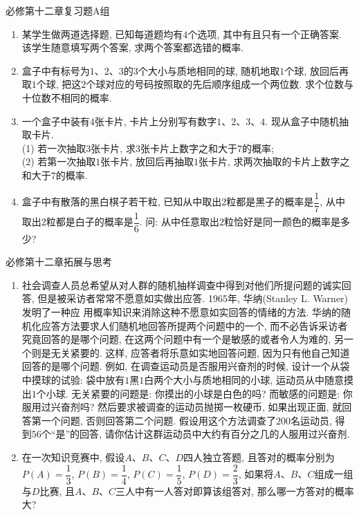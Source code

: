 \documentclass[10pt,a4paper]{article}
\begin{document}
必修第十二章复习题A组

\begin{enumerate}[1.]
\item 某学生做两道选择题, 已知每道题均有$4$个选项, 其中有且只有一个正确答案. 该学生随意填写两个答案, 求两个答案都选错的概率.
\item 盒子中有标号为$1$、$2$、$3$的$3$个大小与质地相同的球, 随机地取$1$个球, 放回后再取$1$个球, 把这$2$个球对应的号码按照取的先后顺序组成一个两位数. 求个位数与十位数不相同的概率.
\item 一个盒子中装有$4$张卡片, 卡片上分别写有数字$1$、$2$、$3$、$4$. 现从盒子中随机抽取卡片.\\
(1) 若一次抽取$3$张卡片, 求$3$张卡片上数字之和大于$7$的概率;\\
(2) 若第一次抽取$1$张卡片, 放回后再抽取$1$张卡片, 求两次抽取的卡片上数字之和大于$7$的概率.
\item 盒子中有散落的黑白棋子若干粒, 已知从中取出$2$粒都是黑子的概率是$\dfrac 17$, 从中取出$2$粒都是白子的概率是$\dfrac 16$. 问: 从中任意取出$2$粒恰好是同一颜色的概率是多少?
\end{enumerate}

必修第十二章拓展与思考

\begin{enumerate}[1.]
\item 社会调查人员总希望从对人群的随机抽样调查中得到对他们所提问题的诚实回答, 但是被采访者常常不愿意如实做出应答. 1965年, 华纳(Stanley L. Warner)发明了一种应
用概率知识来消除这种不愿意如实回答的情绪的方法. 华纳的随机化应答方法要求人们随机地回答所提两个问题中的一个, 而不必告诉采访者究竟回答的是哪个问题, 在这两个问题中有一个是敏感的或者令人为难的, 另一个则是无关紧要的. 这样, 应答者将乐意如实地回答问题, 因为只有他自己知道回答的是哪个问题. 例如, 在调查运动员是否服用兴奋剂的时候, 设计一个从袋中摸球的试验: 袋中放有$1$黑$1$白两个大小与质地相同的小球, 运动员从中随意摸出$1$个小球. 无关紧要的问题是: 你摸出的小球是白色的吗? 而敏感的问题是: 你服用过兴奋剂吗? 然后要求被调查的运动员抛掷一枚硬币, 如果出现正面, 就回答第一个问题, 否则回答第二个问题. 假设用这个方法调查了$200$名运动员, 得到$56$个``是''的回答, 请你估计这群运动员中大约有百分之几的人服用过兴奋剂.
\item 在一次知识竞赛中, 假设$A$、$B$、$C$、$D$四人独立答题, 且答对的概率分别为$P(A)=\dfrac 13$, $P(B)=\dfrac 14$, $P(C)=\dfrac 15$, $P(D)=\dfrac 23$, 如果将$A$、$B$、$C$组成一组与$D$比赛, 且$A$、$B$、$C$三人中有一人答对即算该组答对, 那么哪一方答对的概率大?
\end{enumerate}
\end{document}
